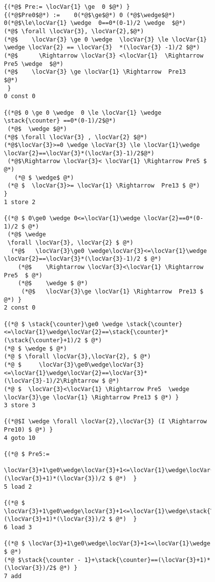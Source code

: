 \begin{figure}
{\scriptsize
\begin{lstlisting}[frame=trbl]
{(*@$ Pre:= \locVar{1} \ge  0 $@*) }
{(*@$Pre0$@*) :=    0(*@$\ge$@*) 0 (*@$\wedge$@*) 0(*@$\le\locVar{1} \wedge  0==0*(0-1)/2 \wedge  $@*) 
(*@$ \forall \locVar{3}, \locVar{2},$@*) 
(*@$    \locVar{3} \ge 0 \wedge  \locVar{3} \le \locVar{1} \wedge \locVar{2} == \locVar{3}  *(\locVar{3} -1)/2 $@*)  
(*@$      \Rightarrow \locVar{3} <\locVar{1}  \Rightarrow  Pre5 \wedge  $@*)        
(*@$    \locVar{3} \ge \locVar{1} \Rightarrow  Pre13    $@*) 
 }
0 const 0

{(*@$ 0 \ge 0 \wedge  0 \le \locVar{1} \wedge \stack{\counter} ==0*(0-1)/2$@*) 
 (*@$  \wedge $@*)
(*@$ \forall \locVar{3} , \locVar{2} $@*) 
(*@$\locVar{3}>=0 \wedge \locVar{3} \le \locVar{1}\wedge  \locVar{2}==\locVar{3}*(\locVar{3}-1)/2$@*) 
 (*@$\Rightarrow \locVar{3}< \locVar{1} \Rightarrow Pre5 $ @*) 
   (*@ $ \wedge$ @*) 
 (*@ $  \locVar{3}>= \locVar{1} \Rightarrow  Pre13 $ @*)   }
1 store 2

{(*@ $ 0\ge0 \wedge 0<=\locVar{1}\wedge \locVar{2}==0*(0-1)/2 $ @*) 
 (*@$ \wedge 
 \forall \locVar{3}, \locVar{2} $ @*) 
  (*@$   \locVar{3}\ge0 \wedge\locVar{3}<=\locVar{1}\wedge \locVar{2}==\locVar{3}*(\locVar{3}-1)/2 $ @*) 
    (*@$    \Rightarrow \locVar{3}<\locVar{1} \Rightarrow Pre5  $ @*) 
    (*@$    \wedge $ @*) 
     (*@$   \locVar{3}\ge \locVar{1} \Rightarrow  Pre13 $ @*) }
2 const 0

{(*@ $ \stack{\counter}\ge0 \wedge \stack{\counter}<=\locVar{1}\wedge\locVar{2}==\stack{\counter}*(\stack{\counter}+1)/2 $ @*)
(*@ $ \wedge $ @*)
(*@ $ \forall \locVar{3},\locVar{2}, $ @*)
(*@ $     \locVar{3}\ge0\wedge\locVar{3}<=\locVar{1}\wedge\locVar{2}==\locVar{3}*(\locVar{3}-1)/2\Rightarrow $ @*)
(*@ $  \locVar{3}<\locVar{1} \Rightarrow Pre5  \wedge \locVar{3}\ge \locVar{1} \Rightarrow Pre13 $ @*) }
3 store 3

{(*@$I \wedge \forall \locVar{2},\locVar{3} (I \Rightarrow Pre10) $ @*) }
4 goto 10

{(*@ $ Pre5:=
 \locVar{3}+1\ge0\wedge\locVar{3}+1<=\locVar{1}\wedge\locVar{2}+\locVar{3}==(\locVar{3}+1)*(\locVar{3})/2 $ @*)  }
5 load 2

{(*@ $ \locVar{3}+1\ge0\wedge\locVar{3}+1<=\locVar{1}\wedge\stack{\counter}+\locVar{3}==(\locVar{3}+1)*(\locVar{3})/2 $ @*)  }
6 load 3

{(*@ $ \locVar{3}+1\ge0\wedge\locVar{3}+1<=\locVar{1}\wedge  $ @*)
(*@ $\stack{\counter - 1}+\stack{\counter}==(\locVar{3}+1)*(\locVar{3})/2$ @*) }
7 add


\end{lstlisting}}
\end{figure}

